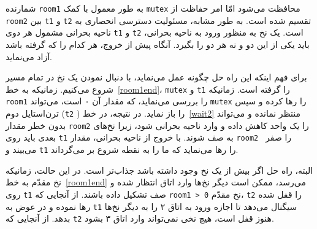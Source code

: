 \documentclass{book}
\begin{document}
    شمارنده  {\tt room1}  به طور معمول با کمک {\tt mutex} محافظت می‌شود امّا امر حفاظت از {\tt room2} 
    بین {\tt t1} و {\tt t2} تقسیم شده است. به طور مشابه، مسئولیت دسترسی انحصاری به ناحیه بحرانی مشمول هر دوی {\tt t1} و {\tt t2} است. 
    یک نخ به منظور ورود به ناحیه بحرانی،  باید یکی از این دو و نه هر دو را بگیرد. آنگاه پیش از خروج، هر کدام را که گرفته باشد آزاد می‌نماید. 

    برای فهم اینکه این راه حل چگونه عمل می‌نماید، با دنبال نمودن یک نخ در تمام مسیر شروع می‌کنیم. 
    زمانیکه به خط~\ref{room1end}، {\tt mutex} و {\tt t1}  را گرفته است. زمانیکه {\tt room1}  را بررسی می‌نماید، که مقدار آن ۰ است، 
    می‌تواند {\tt mutex} را رها کرده و سپس ترن‌استایل دوم ({\tt t2} ) را باز نماید. در نتیجه، در خط~\ref{wait2} منتظر نمانده و می‌تواند بدون خطر 
    مقدار {\tt room2} را یک واحد کاهش داده  و وارد ناحیه بحرانی شود، زیرا نخ‌های بعدی باید روی  {\tt t1} به صف شوند. 
    با خروج از ناحیه بحرانی، مقدار  {\tt room2 } را صفر می‌بیند و {\tt t1} را رها می‌نماید که ما را به نقطه شروع بر می‌گرداند. 

    البته، راه حل اگر بیش از یک نخ وجود داشته باشد جذاب‌تر است. در این حالت، زمانیکه نخ مقدّم به خط~\ref{room1end} می‌رسد، ممکن است دیگر نخ‌ها 
    وارد اتاق انتظار شده  و روی  {\tt t1} صف تشکیل داده باشند. از آنجایی که {\tt room1 > 0} نخ مقدّم، {\tt t2} را قفل شده رها نموده و در عوض 
    به {\tt t1} سیگنال می‌دهد تا اجازه ورود به اتاق ۲ را به دیگر نخ‌ها بدهد. از آنجایی که {\tt t2} هنوز قفل است، هیچ نخی نمی‌تواند وارد اتاق ۳ بشود. 
\end{document}
